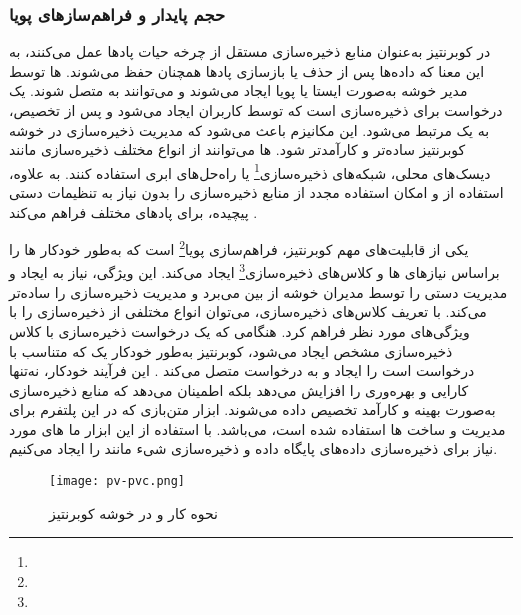 \subsubsection{حجم پایدار و فراهم‌سازهای پویا}
در کوبرنتیز  به‌عنوان منابع ذخیره‌سازی مستقل از چرخه حیات پادها عمل می‌کنند، به این معنا که داده‌ها پس از حذف یا بازسازی پادها همچنان حفظ می‌شوند. ها توسط مدیر خوشه به‌صورت ایستا یا پویا ایجاد می‌شوند و می‌توانند به  متصل شوند.  یک درخواست برای ذخیره‌سازی است که توسط کاربران ایجاد می‌شود و پس از تخصیص، به یک  مرتبط می‌شود. این مکانیزم باعث می‌شود که مدیریت ذخیره‌سازی در خوشه کوبرنتیز ساده‌تر و کارآمدتر شود. ها می‌توانند از انواع مختلف ذخیره‌سازی مانند دیسک‌های محلی، شبکه‌های ذخیره‌سازی\footnote{} یا راه‌حل‌های ابری استفاده کنند. به علاوه، استفاده از  و  امکان استفاده مجدد از منابع ذخیره‌سازی را بدون نیاز به تنظیمات دستی پیچیده، برای پادهای مختلف فراهم می‌کند \cite{Kubernetes1, Kubernetes2}.

یکی از قابلیت‌های مهم کوبرنتیز، فراهم‌سازی پویا\footnote{} است که به‌طور خودکار ها را براساس نیازهای ها و کلاس‌های ذخیره‌سازی\footnote{} ایجاد می‌کند. این ویژگی، نیاز به ایجاد و مدیریت دستی  را توسط مدیران خوشه از بین می‌برد و مدیریت ذخیره‌سازی را ساده‌تر می‌کند. با تعریف کلاس‌های ذخیره‌سازی، می‌توان انواع مختلفی از ذخیره‌سازی را با ویژگی‌های مورد نظر فراهم کرد. هنگامی که یک درخواست ذخیره‌سازی  با کلاس ذخیره‌سازی مشخص ایجاد می‌شود، کوبرنتیز به‌طور خودکار یک  که متناسب با درخواست است را ایجاد و به درخواست متصل می‌کند \cite{Kubernetes1}. این فرآیند خودکار، نه‌تنها کارایی و بهره‌وری را افزایش می‌دهد بلکه اطمینان می‌دهد که منابع ذخیره‌سازی به‌صورت بهینه و کارآمد تخصیص داده می‌شوند. ابزار متن‌بازی که در این پلتفرم برای مدیریت و ساخت ها استفاده شده است،  می‌باشد. با استفاده از این ابزار ما های مورد نیاز برای ذخیره‌سازی داده‌های پایگاه داده و ذخیره‌سازی شیء مانند  را ایجاد می‌کنیم.


\begin{figure}[t]
	\centering
	\texttt{[image: pv-pvc.png]}
	\caption{نحوه کار  و  در خوشه کوبرنتیز}
	\label{fig: pv pvc}
\end{figure}

